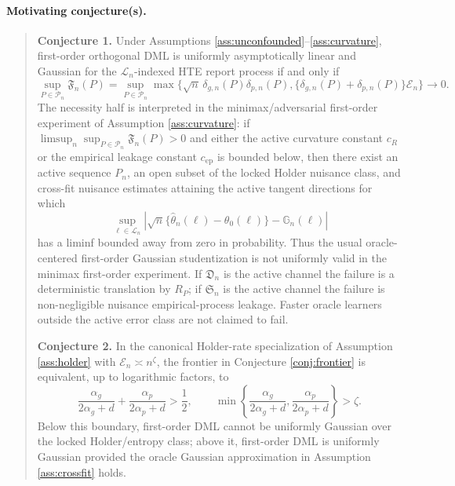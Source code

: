 \documentclass[11pt]{article}
\theoremstyle{definition}
\theoremstyle{plain}
\theoremstyle{remark}
\begin{document}
\paragraph{Motivating conjecture(s).}
\begin{quote}
\label{conj:frontier}
\textbf{Conjecture 1.}
Under Assumptions \ref{ass:unconfounded}--\ref{ass:curvature}, first-order
orthogonal DML is uniformly asymptotically linear and Gaussian for the
\(\mathcal{L}_n\)-indexed HTE report process if and only if
\[
\sup_{P\in\mathcal{P}_n}\mathfrak{F}_n(P)
=\sup_{P\in\mathcal{P}_n}\max\{\sqrt n\,\delta_{g,n}(P)\delta_{p,n}(P),
\{\delta_{g,n}(P)+\delta_{p,n}(P)\}\mathcal{E}_n\}
\longrightarrow0 .
\]
The necessity half is interpreted in the minimax/adversarial first-order
experiment of Assumption \ref{ass:curvature}: if
\(\limsup_n\sup_{P\in\mathcal{P}_n}\mathfrak{F}_n(P)>0\) and either the active
curvature constant \(c_R\) or the empirical leakage constant \(c_{\mathrm{ep}}\)
is bounded below, then there exist an active sequence \(P_n\), an open subset
of the locked Holder nuisance class, and cross-fit nuisance estimates attaining
the active tangent directions for which
\[
\sup_{\ell\in\mathcal{L}_n}
\left|\sqrt n\{\hat\theta_n(\ell)-\theta_0(\ell)\}-\mathbb{G}_n(\ell)\right|
\]
has a liminf bounded away from zero in probability.  Thus the usual
oracle-centered first-order Gaussian studentization is not uniformly valid in
the minimax first-order experiment.  If \(\mathfrak{D}_n\) is the active
channel the failure is a deterministic translation by \(R_P\); if
\(\mathfrak{S}_n\) is the active channel the failure is non-negligible nuisance
empirical-process leakage.  Faster oracle learners outside the active error
class are not claimed to fail.

\label{conj:holder}
\textbf{Conjecture 2.}
In the canonical Holder-rate specialization of Assumption \ref{ass:holder} with
\(\mathcal{E}_n\asymp n^\zeta\), the frontier in Conjecture
\ref{conj:frontier} is equivalent, up to logarithmic factors, to
\[
\frac{\alpha_g}{2\alpha_g+d}+\frac{\alpha_p}{2\alpha_p+d}
>\frac12,\qquad
\min\left\{\frac{\alpha_g}{2\alpha_g+d},\frac{\alpha_p}{2\alpha_p+d}\right\}
>\zeta.
\]
Below this boundary, first-order DML cannot be uniformly Gaussian over the
locked Holder/entropy class; above it, first-order DML is uniformly Gaussian
provided the oracle Gaussian approximation in Assumption \ref{ass:crossfit}
holds.
\end{quote}
\end{document}
